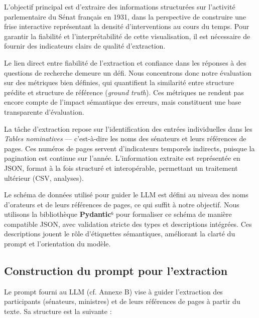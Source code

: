 L’objectif principal est d’extraire des informations structurées sur l’activité parlementaire du Sénat français en 1931, dans la perspective de construire une frise interactive représentant la densité d’interventions au cours du temps. Pour garantir la fiabilité et l’interprétabilité de cette visualisation, il est nécessaire de fournir des indicateurs clairs de qualité d’extraction.

Le lien direct entre fiabilité de l’extraction et confiance dans les réponses à des questions de recherche demeure un défi. Nous concentrons donc notre évaluation sur des métriques bien définies, qui quantifient la similarité entre structure prédite et structure de référence (\emph{ground truth}). Ces métriques ne rendent pas encore compte de l’impact sémantique des erreurs, mais constituent une base transparente d’évaluation.

La tâche d’extraction repose sur l’identification des entrées individuelles dans les \emph{Tables nominatives} — c’est-à-dire les noms des sénateurs et leurs références de pages. Ces numéros de pages servent d’indicateurs temporels indirects, puisque la pagination est continue sur l’année. L’information extraite est représentée en JSON, format à la fois structuré et interopérable, permettant un traitement ultérieur (CSV, analyses).

Le schéma de données utilisé pour guider le LLM est défini au niveau des noms d’orateurs et de leurs références de pages, ce qui suffit à notre objectif. Nous utilisons la bibliothèque \textbf{Pydantic}⁶ pour formaliser ce schéma de manière compatible JSON, avec validation stricte des types et descriptions intégrées. Ces descriptions jouent le rôle d’étiquettes sémantiques, améliorant la clarté du prompt et l’orientation du modèle.

\subsection{Construction du prompt pour l’extraction}

Le prompt fourni au LLM (cf. Annexe B) vise à guider l’extraction des participants (sénateurs, ministres) et de leurs références de pages à partir du texte. Sa structure est la suivante :

